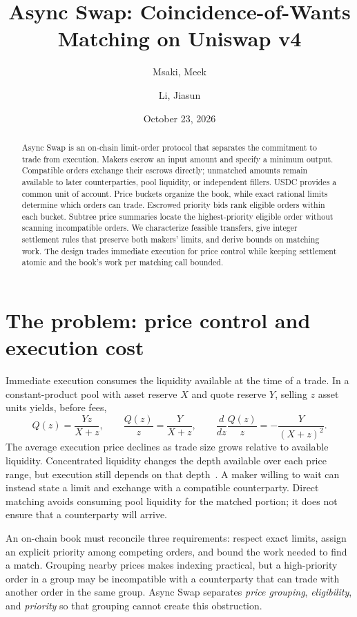 \documentclass{article}
\title{Async Swap: Coincidence-of-Wants Matching on Uniswap v4}
\author{Msaki, Meek \and Li, Jiasun}
\date{October 23, 2026}
\begin{document}
\maketitle

\begin{abstract}
Async Swap is an on-chain limit-order protocol that separates the commitment to trade from
execution. Makers escrow an input amount and specify a minimum output. Compatible orders
exchange their escrows directly; unmatched amounts remain available to later counterparties,
pool liquidity, or independent fillers. USDC provides a common unit of account. Price buckets
organize the book, while exact rational limits determine which orders can trade. Escrowed
priority bids rank eligible orders within each bucket. Subtree price summaries locate the
highest-priority eligible order without scanning incompatible orders. We characterize feasible
transfers, give integer settlement rules that preserve both makers' limits, and derive bounds
on matching work. The design trades immediate execution for price control while keeping
settlement atomic and the book's work per matching call bounded.
\end{abstract}

\section{The problem: price control and execution cost}

Immediate execution consumes the liquidity available at the time of a trade. In a constant-product
pool with asset reserve $X$ and quote reserve $Y$, selling $z$ asset units yields, before fees,
\begin{equation}
 Q(z)=\frac{Yz}{X+z},\qquad
 \frac{Q(z)}{z}=\frac{Y}{X+z},\qquad
 \frac{d}{dz}\frac{Q(z)}{z}=-\frac{Y}{(X+z)^2}.
\end{equation}
The average execution price declines as trade size grows relative to available liquidity.
Concentrated liquidity changes the depth available over each price range, but execution
still depends on that depth~\cite{UniswapV3}. A maker willing to wait can instead state a
limit and exchange with a compatible counterparty. Direct matching avoids consuming pool
liquidity for the matched portion; it does not ensure that a counterparty will arrive.

An on-chain book must reconcile three requirements: respect exact limits, assign an explicit
priority among competing orders, and bound the work needed to find a match. Grouping nearby
prices makes indexing practical, but a high-priority order in a group may be incompatible
with a counterparty that can trade with another order in the same group. Async Swap separates
\emph{price grouping}, \emph{eligibility}, and \emph{priority} so that grouping cannot create
this obstruction.
\end{document}
